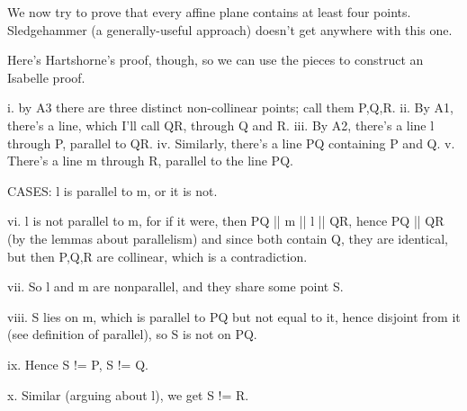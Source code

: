 \begin{isabellebody}
\begin{isamarkuptext}
\siqi%
\end{isamarkuptext}\isamarkuptrue%
%
\begin{isamarkuptext}%
We now try to prove that every affine plane contains at least four points. Sledgehammer 
(a generally-useful approach) doesn't get anywhere with this one. 

Here's Hartshorne's proof, though, so we can use the pieces to construct an Isabelle proof.

i. by A3 there are three distinct non-collinear points; call them P,Q,R. 
ii. By A1, there's a line, which I'll call QR, through Q and R. 
iii. By A2, there's a line l through P, parallel to QR.
iv. Similarly, there's a line PQ containing P and Q. 
v. There's a line m through R, parallel to the line PQ.

CASES: l is parallel to m, or it is not.  

vi. l is not parallel to m, for if it were, then PQ || m || l || QR, hence PQ || QR (by 
the lemmas about parallelism) and since both contain Q,  they are identical, but then P,Q,R are collinear,
which is a contradiction. 

vii. So l and m are nonparallel, and they share some point S. 

viii. S lies on m, which is parallel to PQ but not equal to it,
hence disjoint from it (see definition of parallel), so S is not on PQ.

ix.  Hence S != P, S != Q. 

x. Similar (arguing about l), we get  S != R. 


\end{isamarkuptext}
\end{isabellebody}
